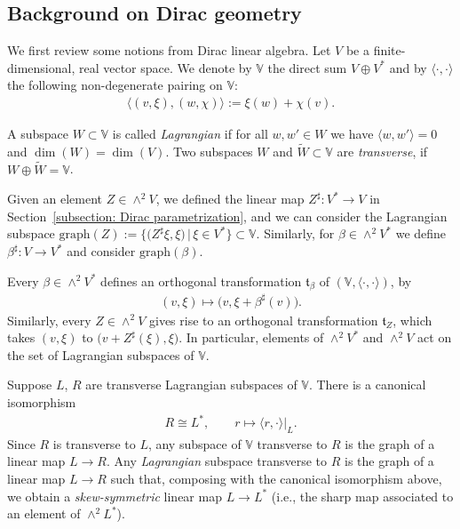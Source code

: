 \documentclass[10pt,a4paper]{amsart}
\numberwithin{equation}{section}
\newcommand{\V}{\mathbb{V}}
\renewcommand{\t}{\mathfrak{t}}
\begin{document}
\subsection{Background on Dirac geometry}
We first review some notions from Dirac linear algebra. Let $V$ be a finite-dimensional, real vector space. We denote by $\mathbb{V}$ the direct sum $V\oplus V^*$ and by $\langle \cdot,\cdot \rangle$ the following non-degenerate pairing on $\V$:
\begin{gather*} \langle (v,\xi),(w,\chi)\rangle := \xi(w) + \chi(v).\end{gather*}

\begin{Definition}A subspace $W\subset \V$ is called {\em Lagrangian} if for all $w,w'\in W$ we have $\langle w,w'\rangle =0$ and $\dim(W)=\dim(V)$. Two subspaces $W$ and $\tilde{W}\subset \V$ are {\em transverse}, if $W\oplus \tilde{W}=\V$.
\end{Definition}

Given an element $Z\in \wedge^2V$, we defined the linear map $Z^\sharp \colon V^* \to V$ in Section~\ref{subsection: Dirac parametrization}, and we can consider the Lagrangian subspace $\mathrm{graph}(Z) :=\big\{\big(Z^\sharp\xi,\xi\big) \, | \, \xi \in V^*\big\}\subset \V$. Similarly, for $\beta \in \wedge^2 V^*$ we define $\beta^\sharp\colon V\to V^*$ and consider $\mathrm{graph}(\beta)$.

Every $\beta \in \wedge^2 V^*$ defines an orthogonal transformation $\t_\beta$ of $(\V,\langle \cdot,\cdot \rangle)$, by
\begin{gather*}(v,\xi)\mapsto \big(v,\xi+\beta^\sharp(v)\big).\end{gather*}
Similarly, every $Z\in \wedge^2 V$ gives rise to an orthogonal transformation $\t_Z$, which takes $(v,\xi)$ to $\big(v + Z^\sharp(\xi),\xi\big)$. In particular, elements of $\wedge^2 V^*$ and $\wedge^2 V$ act on the set of Lagrangian subspaces of $\V$.

\begin{Remark}\label{rem:graphdirac} Suppose $L$, $R$ are transverse Lagrangian subspaces of $\V$. There is a canonical isomorphism \begin{gather*}R\cong L^*, \qquad r\mapsto \langle r, \cdot \rangle|_L.\end{gather*}
Since $R$ is transverse to $L$, any subspace of $\V$ transverse to $R$ is the graph of a linear map $L\to R$. Any \emph{Lagrangian} subspace transverse to $R$ is the graph of a linear map $L\to R$ such that, composing with the canonical isomorphism above, we obtain a \emph{skew-symmetric} linear map $L\to L^*$ (i.e., the sharp map associated to an element of $\wedge^2 L^*$).
\end{Remark}
\end{document}
